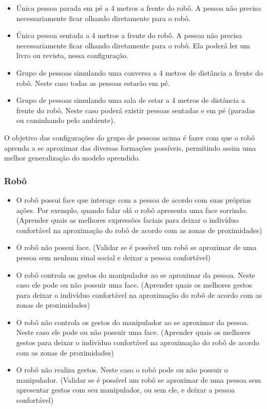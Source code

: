 \begin{itemize}
	\item Única pessoa parada em pé a 4 metros a frente do robô. A pessoa não precisa necessariamente ficar olhando diretamente para o robô.
	\item Única pessoa sentada a 4 metros a frente do robô. A pessoa não precisa necessariamente ficar olhando diretamente para o robô. Ela poderá ler um livro ou revista, nessa configuração.
	\item Grupo de pessoas simulando uma conversa a 4 metros de distância a frente do robô. Neste caso todas as pessoas estarão em pé.
	\item Grupo de pessoas simulando uma sala de estar a 4 metros de distância a frente do robô. Neste caso poderá existir pessoas sentadas e em pé (paradas ou caminhando pelo ambiente).
\end{itemize}

O objetivo das configurações do grupo de pessoas acima é fazer com que o robô aprenda a se aproximar das diversas formações possíveis, permitindo assim uma melhor generalização do modelo aprendido.

\subsubsection{Robô}

\begin{itemize}
	\item O robô possui face que interage com a pessoa de acordo com suas próprias ações. Por exemplo, quando falar olá o robô apresenta uma face sorrindo. (Aprender quais as melhores expressões faciais para deixar o indivíduo confortável na aproximação do robô de acordo com as zonas de proximidades)
	\item O robô não possui face. (Validar se é possível um robô se aproximar de uma pessoa sem nenhum sinal social e deixar a pessoa confortável)
	\item O robô controla os gestos do manipulador ao se aproximar da pessoa. Neste caso ele pode ou não possuir uma face. (Aprender quais os melhores gestos para deixar o indivíduo confortável na aproximação do robô de acordo com as zonas de proximidades)
	\item O robô não controla os gestos do manipulador ao se aproximar da pessoa. Neste caso ele pode ou não possuir uma face. (Aprender quais os melhores gestos para deixar o indivíduo confortável na aproximação do robô de acordo com as zonas de proximidades)
	\item O robô não realiza gestos. Neste caso o robô pode ou não possuir o manipulador. (Validar se é possível um robô se aproximar de uma pessoa sem apresentar gestos com seu manipulador, ou sem ele, e deixar a pessoa confortável)
\end{itemize}

